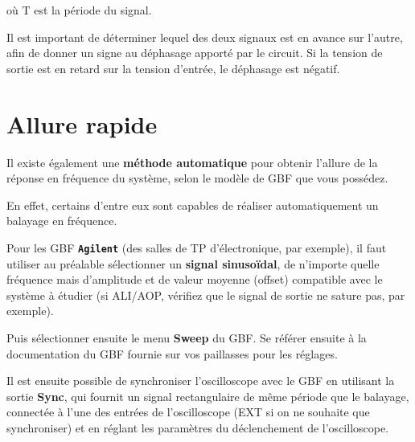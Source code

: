où T est la période du signal.

Il est important de déterminer lequel des deux signaux est en avance sur l'autre, afin de donner un signe au déphasage apporté par le circuit. Si la tension de sortie est en retard sur la tension d'entrée, le déphasage est négatif.


\section{Allure rapide}

Il existe également une \textbf{méthode automatique} pour obtenir l'allure de la réponse en fréquence du système, selon le modèle de GBF que vous possédez.

En effet, certains d'entre eux sont capables de réaliser automatiquement un balayage en fréquence.

Pour les GBF \textbf{\texttt{Agilent}} (des salles de TP d'électronique, par exemple), il faut utiliser au préalable sélectionner un \textbf{signal sinusoïdal}, de n'importe quelle fréquence mais d'amplitude et de valeur moyenne (offset) compatible avec le système à étudier (si ALI/AOP, vérifiez que le signal de sortie ne sature pas, par exemple).

Puis sélectionner ensuite le menu \textbf{Sweep} du GBF. Se référer ensuite à la documentation du GBF fournie sur vos paillasses pour les réglages.


Il est ensuite possible de synchroniser l'oscilloscope avec le GBF en utilisant la sortie \textbf{Sync}, qui fournit un signal rectangulaire de même période que le balayage, connectée à l'une des entrées de l'oscilloscope (EXT si on ne souhaite que synchroniser) et en réglant les paramètres du déclenchement de l'oscilloscope.